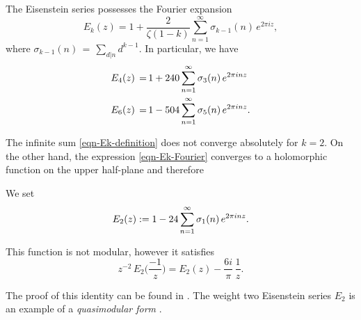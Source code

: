 \begin{lemma}\label{lemma-Ek-Fourier}
The Eisenstein series possesses the Fourier expansion
\begin{equation}\label{eqn-Ek-Fourier}E_k(z)=1+\frac{2}{\zeta(1-k)}\sum_{n=1}^\infty \sigma_{k-1}(n)\,e^{2\pi i z}, \end{equation}
where $\sigma_{k-1}(n)\,=\,\sum_{d|n} d^{k-1}$. In particular, we have
\begin{align}
  E_4(z)\,=\,& 1+240\sum_{n=1}^\infty \sigma_3(n)\,e^{2\pi i n z} \notag \\
  E_6(z)\,=\,& 1-504\sum_{n=1}^\infty \sigma_5(n)\,e^{2\pi i n z}. \notag
\end{align}
\end{lemma}\label{lemma-E2-not-abs-conv}
The infinite sum \eqref{eqn-Ek-definition} does not converge absolutely for $k=2$. On the other hand, the expression \eqref{eqn-Ek-Fourier} converges to a holomorphic function on the upper half-plane and therefore
\begin{definition}\label{def-E2} %
We set
\begin{equation}E_2(z):= 1-24\sum_{n=1}^\infty \sigma_1(n)\,e^{2\pi i n z}.\notag\end{equation}
\end{definition}
\begin{lemma}\label{lemma-E2-transform}
This function is not modular, however it satisfies
\begin{equation}\label{eqn-E2-transform}z^{-2}\,E_2\Big(\frac{-1}{z}\Big)=E_2(z) -\frac{6i}{\pi}\, \frac{1}{z}.\end{equation}
\end{lemma}
The proof of this identity can be found in \cite[Section~2.3]{1-2-3}.
The weight two Eisenstein series $E_2$ is an example of a \emph{quasimodular form} \cite[Section~5.1]{1-2-3}.

